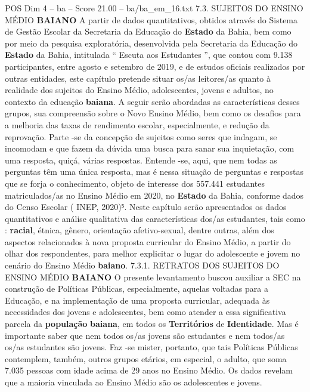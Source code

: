 \begin{textsample}{POS Dim 4 – ba – Score 21.00 – ba/ba\_em\_16.txt}  \label{ex:f4_pos_021}
7.3.
SUJEITOS DO ENSINO MÉDIO \textbf{BAIANO} A partir de dados quantitativos, obtidos através do Sistema de Gestão Escolar da Secretaria da Educação do \textbf{Estado} da Bahia, bem como por meio da pesquisa exploratória, desenvolvida pela Secretaria da Educação do \textbf{Estado} da Bahia, intitulada “ Escuta aos Estudantes ”, que contou com 9.138 participantes, entre agosto e setembro de 2019, e de estudos oficiais realizados por outras entidades, este capítulo pretende situar os/as leitores/as quanto à realidade dos sujeitos do Ensino Médio, adolescentes, jovens e adultos, no contexto da educação \textbf{baiana}.
A seguir serão abordadas as características desses grupos, sua compreensão sobre o Novo Ensino Médio, bem como os desafios para a melhoria das taxas de rendimento escolar, especialmente, e redução da reprovação.
Parte -se da concepção de sujeitos como seres que indagam, se incomodam e que fazem da dúvida uma busca para sanar sua inquietação, com uma resposta, quiçá, várias respostas.
Entende -se, aqui, que nem todas as perguntas têm uma única resposta, mas é nessa situação de perguntas e respostas que se forja o conhecimento, objeto de interesse dos 557.441 estudantes matriculados/as no Ensino Médio em 2020, no \textbf{Estado} da Bahia, conforme dados do Censo Escolar ( INEP, 2020)⁵.
Neste capítulo serão apresentados os dados quantitativos e análise qualitativa das características dos/as estudantes, tais como : \textbf{racial}, étnica, gênero, orientação afetivo-sexual, dentre outras, além dos aspectos relacionados à nova proposta curricular do Ensino Médio, a partir do olhar dos respondentes, para melhor explicitar o lugar do adolescente e jovem no cenário do Ensino Médio \textbf{baiano}. 7.3.1.
RETRATOS DOS SUJEITOS DO ENSINO MÉDIO \textbf{BAIANO} O presente levantamento buscou auxiliar a SEC na construção de Políticas Públicas, especialmente, aquelas voltadas para a Educação, e na implementação de uma proposta curricular, adequada às necessidades dos jovens e adolescentes, bem como atender a essa significativa parcela da \textbf{população} \textbf{baiana}, em todos os \textbf{Territórios} de \textbf{Identidade}.
Mas é importante saber que nem todos os/as jovens são estudantes e nem todos/as os/as estudantes são jovens.
Faz -se mister, portanto, que tais Políticas Públicas contemplem, também, outros grupos etários, em especial, o adulto, que soma 7.035 pessoas com idade acima de 29 anos no Ensino Médio.
Os dados revelam que a maioria vinculada ao Ensino Médio são os adolescentes e jovens.

\end{textsample}
